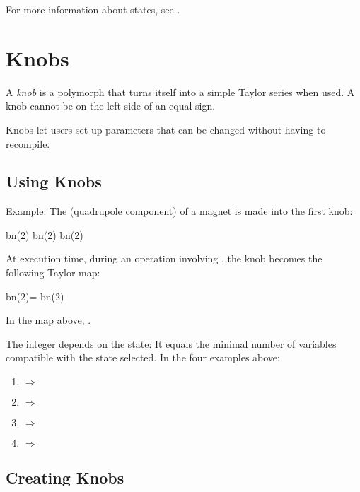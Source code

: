For more information about states, see .


\section{Knobs}

%
A \emph{knob} is a polymorph that turns itself into a simple Taylor
series when used. A knob cannot be on the left side of an equal sign.

Knobs let users set up parameters that can be changed without having to recompile.


\subsection{Using Knobs}

%
Example: The  (quadrupole component) of a magnet is
made into the first knob:

\begin{ptccode}
bn(2)%
bn(2)%
bn(2)%
\end{ptccode}

At execution time, during an operation involving , the
knob becomes the following Taylor map:

\begin{ptccode}
bn(2)= bn(2)%
\end{ptccode}

In the map above, .

The integer  depends on the state: It equals
the minimal number of variables compatible with the state selected.
In the four  examples above:
\begin{enumerate}
  \item {} $\Rightarrow$ 
  \item {} $\Rightarrow$ 
  \item {} $\Rightarrow$ 
  \item {} $\Rightarrow$ 
\end{enumerate}


\subsection{Creating Knobs}

